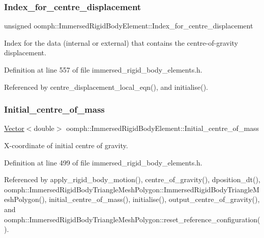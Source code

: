 \subsubsection{\texorpdfstring{Index\+\_\+for\+\_\+centre\+\_\+displacement}{Index\_for\_centre\_displacement}}
{\footnotesize\ttfamily unsigned oomph\+::\+Immersed\+Rigid\+Body\+Element\+::\+Index\+\_\+for\+\_\+centre\+\_\+displacement\hspace{0.3cm}{\ttfamily [private]}}



Index for the data (internal or external) that contains the centre-\/of-\/gravity displacement. 



Definition at line 557 of file immersed\+\_\+rigid\+\_\+body\+\_\+elements.\+h.



Referenced by centre\+\_\+displacement\+\_\+local\+\_\+eqn(), and initialise().

\mbox{\label{classoomph_1_1ImmersedRigidBodyElement_af848df31315115071bdde1eded9aa6d1}} 
\subsubsection{\texorpdfstring{Initial\+\_\+centre\+\_\+of\+\_\+mass}{Initial\_centre\_of\_mass}}
{\footnotesize\ttfamily \hyperlink{classoomph_1_1Vector}{Vector}$<$double$>$ oomph\+::\+Immersed\+Rigid\+Body\+Element\+::\+Initial\+\_\+centre\+\_\+of\+\_\+mass\hspace{0.3cm}{\ttfamily [protected]}}



X-\/coordinate of initial centre of gravity. 



Definition at line 499 of file immersed\+\_\+rigid\+\_\+body\+\_\+elements.\+h.



Referenced by apply\+\_\+rigid\+\_\+body\+\_\+motion(), centre\+\_\+of\+\_\+gravity(), dposition\+\_\+dt(), oomph\+::\+Immersed\+Rigid\+Body\+Triangle\+Mesh\+Polygon\+::\+Immersed\+Rigid\+Body\+Triangle\+Mesh\+Polygon(), initial\+\_\+centre\+\_\+of\+\_\+mass(), initialise(), output\+\_\+centre\+\_\+of\+\_\+gravity(), and oomph\+::\+Immersed\+Rigid\+Body\+Triangle\+Mesh\+Polygon\+::reset\+\_\+reference\+\_\+configuration().

